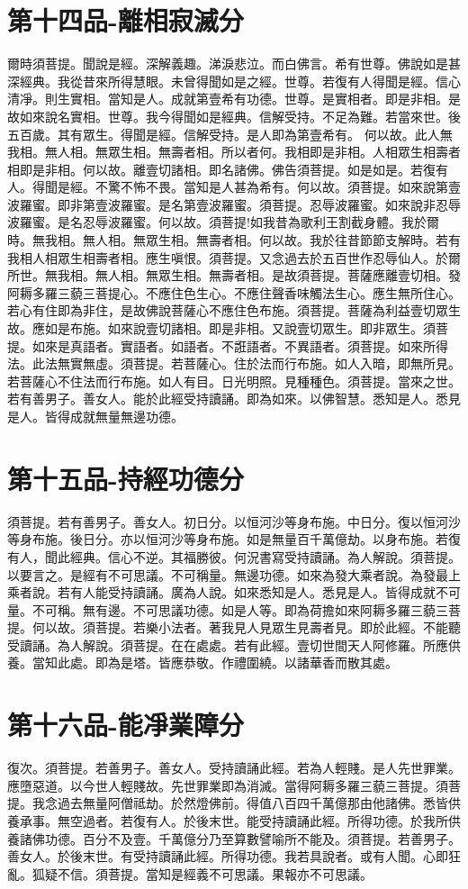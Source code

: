 \documentclass[a6paper, 22pt, twocolumn]{cvertbook}
\begin{document}
\chapter{第十四品-離相寂滅分}
\large 爾時須菩提。聞說是經。深解義趣。涕淚悲泣。而白佛言。希有世尊。佛說如是甚深經典。我從昔來所得慧眼。未曾得聞如是之經。世尊。若復有人得聞是經。信心清凈。則生實相。當知是人。成就第壹希有功德。世尊。是實相者。即是非相。是故如來說名實相。世尊。我今得聞如是經典。信解受持。不足為難。若當來世。後五百歲。其有眾生。得聞是經。信解受持。是人即為第壹希有。
何以故。此人無我相。無人相。無眾生相。無壽者相。所以者何。我相即是非相。人相眾生相壽者相即是非相。何以故。離壹切諸相。即名諸佛。佛告須菩提。如是如是。若復有人。得聞是經。不驚不怖不畏。當知是人甚為希有。何以故。須菩提。如來說第壹波羅蜜。即非第壹波羅蜜。是名第壹波羅蜜。須菩提。忍辱波羅蜜。如來說非忍辱波羅蜜。是名忍辱波羅蜜。何以故。須菩提!如我昔為歌利王割截身體。我於爾時。無我相。無人相。無眾生相。無壽者相。何以故。我於往昔節節支解時。若有我相人相眾生相壽者相。應生嗔恨。須菩提。又念過去於五百世作忍辱仙人。於爾所世。無我相。無人相。無眾生相。無壽者相。是故須菩提。菩薩應離壹切相。發阿耨多羅三藐三菩提心。不應住色生心。不應住聲香味觸法生心。應生無所住心。若心有住即為非住，是故佛說菩薩心不應住色布施。須菩提。菩薩為利益壹切眾生故。應如是布施。如來說壹切諸相。即是非相。又說壹切眾生。即非眾生。須菩提。如來是真語者。實語者。如語者。不誑語者。不異語者。須菩提。如來所得法。此法無實無虛。須菩提。若菩薩心。住於法而行布施。如人入暗，即無所見。若菩薩心不住法而行布施。如人有目。日光明照。見種種色。須菩提。當來之世。若有善男子。善女人。能於此經受持讀誦。即為如來。以佛智慧。悉知是人。悉見是人。皆得成就無量無邊功德。
\chapter{第十五品-持經功德分}
\large 須菩提。若有善男子。善女人。初日分。以恒河沙等身布施。中日分。復以恒河沙等身布施。後日分。亦以恒河沙等身布施。如是無量百千萬億劫。以身布施。若復有人，聞此經典。信心不逆。其福勝彼。何況書寫受持讀誦。為人解說。須菩提。以要言之。是經有不可思議。不可稱量。無邊功德。如來為發大乘者說。為發最上乘者說。若有人能受持讀誦。廣為人說。如來悉知是人。悉見是人。皆得成就不可量。不可稱。無有邊。不可思議功德。如是人等。即為荷擔如來阿耨多羅三藐三菩提。何以故。須菩提。若樂小法者。著我見人見眾生見壽者見。即於此經。不能聽受讀誦。為人解說。須菩提。在在處處。若有此經。壹切世間天人阿修羅。所應供養。當知此處。即為是塔。皆應恭敬。作禮圍繞。以諸華香而散其處。
\chapter{第十六品-能凈業障分}
\large 復次。須菩提。若善男子。善女人。受持讀誦此經。若為人輕賤。是人先世罪業。應墮惡道。以今世人輕賤故。先世罪業即為消滅。當得阿耨多羅三藐三菩提。須菩提。我念過去無量阿僧祗劫。於然燈佛前。得值八百四千萬億那由他諸佛。悉皆供養承事。無空過者。若復有人。於後末世。能受持讀誦此經。所得功德。於我所供養諸佛功德。百分不及壹。千萬億分乃至算數譬喻所不能及。須菩提。若善男子。善女人。於後末世。有受持讀誦此經。所得功德。我若具說者。或有人聞。心即狂亂。狐疑不信。須菩提。當知是經義不可思議。果報亦不可思議。
\end{document}
